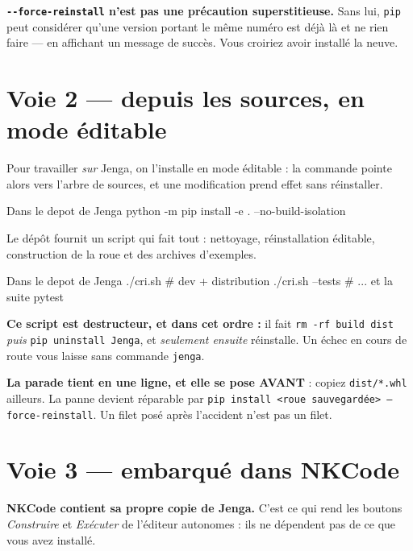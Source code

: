 \begin{nkretenir}
\textbf{\texttt{-{}-force-reinstall} n'est pas une précaution superstitieuse.}
Sans lui, \texttt{pip} peut considérer qu'une version portant le même numéro est
déjà là et ne rien faire --- en affichant un message de succès. Vous croiriez
avoir installé la neuve.
\end{nkretenir}

\section{Voie 2 --- depuis les sources, en mode éditable}

Pour travailler \emph{sur} Jenga, on l'installe en mode éditable : la commande
pointe alors vers l'arbre de sources, et une modification prend effet sans
réinstaller.

\begin{nkcode}{Dans le depot de Jenga}
python -m pip install -e . --no-build-isolation
\end{nkcode}

Le dépôt fournit un script qui fait tout : nettoyage, réinstallation éditable,
construction de la roue et des archives d'exemples.

\begin{nkcode}{Dans le depot de Jenga}
./cri.sh              # dev + distribution
./cri.sh --tests      # ... et la suite pytest
\end{nkcode}

\begin{nkpiege}
\textbf{Ce script est destructeur, et dans cet ordre :} il fait
\texttt{rm -rf build dist} \emph{puis} \texttt{pip uninstall Jenga}, et
\emph{seulement ensuite} réinstalle. Un échec en cours de route vous laisse sans
commande \texttt{jenga}.

\textbf{La parade tient en une ligne, et elle se pose AVANT} : copiez
\texttt{dist/*.whl} ailleurs. La panne devient réparable par
\texttt{pip install <roue sauvegardée> --force-reinstall}. Un filet posé après
l'accident n'est pas un filet.
\end{nkpiege}

\section{Voie 3 --- embarqué dans NKCode}

\textbf{NKCode contient sa propre copie de Jenga.} C'est ce qui rend les boutons
\emph{Construire} et \emph{Exécuter} de l'éditeur autonomes : ils ne dépendent
pas de ce que vous avez installé.

